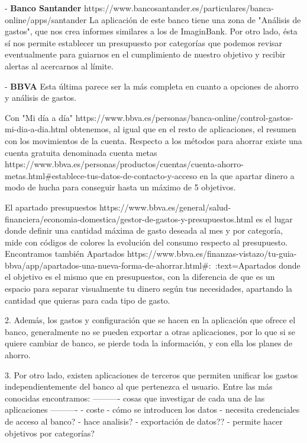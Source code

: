 - \textbf{Banco Santander}
https://www.bancosantander.es/particulares/banca-online/apps/santander
La aplicación de este banco tiene una zona de "Análisis de gastos", que nos crea 
informes similares a los de ImaginBank. 
Por otro lado, ésta sí nos permite establecer un 
presupuesto por categorías que podemos revisar eventualmente para guiarnos en el 
cumplimiento de nuestro objetivo y recibir alertas al acercarnos al límite.

- \textbf{BBVA}
Esta última parece ser la más completa en cuanto a opciones de ahorro y análisis de gastos.

Con "Mi día a día" https://www.bbva.es/personas/banca-online/control-gastos-mi-dia-a-dia.html 
obtenemos, al igual que en el resto de aplicaciones, el resumen con los movimientos de la cuenta.
Respecto a los métodos para ahorrar existe una cuenta gratuita denominada 
cuenta metas https://www.bbva.es/personas/productos/cuentas/cuenta-ahorro-metas.html#establece-tus-datos-de-contacto-y-acceso 
en la que apartar dinero a modo de hucha para conseguir hasta un máximo de 5 objetivos. 

El apartado presupuestos https://www.bbva.es/general/salud-financiera/economia-domestica/gestor-de-gastos-y-presupuestos.html 
es el lugar donde definir una cantidad máxima de gasto deseada 
al mes y por categoría, mide con códigos de colores la evolución del consumo 
respecto al presupuesto.
Encontramos también Apartados https://www.bbva.es/finanzas-vistazo/tu-guia-bbva/app/apartados-una-nueva-forma-de-ahorrar.html#:~:text=Apartados%
donde el objetivo es el mismo que en presupuestos, con la diferencia de 
que es un espacio para separar visualmente tu dinero según tus necesidades,
apartando la cantidad que quieras para cada tipo de gasto.

2. Además, los gastos y configuración que se hacen en la aplicación que ofrece 
el banco, generalmente no se pueden exportar a otras aplicaciones,
por lo que si se quiere cambiar de banco, se pierde toda la información, 
y con ella los planes de ahorro.

3. Por otro lado, existen aplicaciones de terceros que permiten unificar los gastos 
independientemente del banco al que pertenezca el usuario. Entre las más conocidas 
encontramos:
---------- cosas que investigar de cada una de las aplicaciones ----------
- coste 
- cómo se introducen los datos
- necesita credenciales de acceso al banco?
- hace analisis?
- exportación de datos??
- permite hacer objetivos por categorías?

